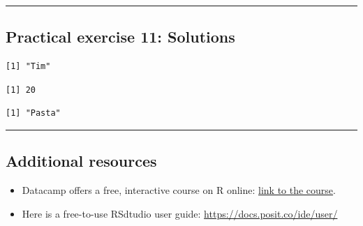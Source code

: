 \documentclass[
  letterpaper,
  DIV=11,
  numbers=noendperiod]{scrartcl}
\newenvironment{Shaded}{\begin{snugshade}}{\end{snugshade}}
\newcommand{\DecValTok}[1]{\textcolor[rgb]{0.68,0.00,0.00}{#1}}
\newcommand{\NormalTok}[1]{\textcolor[rgb]{0.00,0.23,0.31}{#1}}
\newcommand{\SpecialCharTok}[1]{\textcolor[rgb]{0.37,0.37,0.37}{#1}}
\providecommand{\tightlist}{%
  \setlength{\itemsep}{0pt}\setlength{\parskip}{0pt}}
\begin{document}
\begin{center}\rule{0.5\linewidth}{0.5pt}\end{center}

\subsection{Practical exercise 11:
Solutions}\label{practical-exercise-11-solutions}

\begin{Shaded}
\end{Shaded}

\begin{verbatim}
[1] "Tim"
\end{verbatim}

\begin{Shaded}
\end{Shaded}

\begin{verbatim}
[1] 20
\end{verbatim}

\begin{Shaded}
\end{Shaded}

\begin{verbatim}
[1] "Pasta"
\end{verbatim}

\begin{center}\rule{0.5\linewidth}{0.5pt}\end{center}

\subsection{Additional resources}\label{additional-resources}

\begin{itemize}
\tightlist
\item
  Datacamp offers a free, interactive course on R online:
  \href{https://www.datacamp.com/courses/free-introduction-to-r}{link to
  the course}.
\item
  Here is a free-to-use RSdtudio user guide:
  \url{https://docs.posit.co/ide/user/}
\end{itemize}
\end{document}
